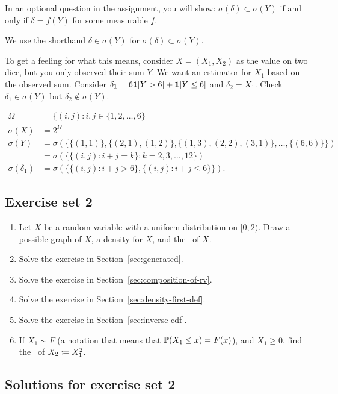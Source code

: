 \documentclass{article}
\begin{document}
 In an optional question in the assignment, you will show: $\sigma(\delta) \subset \sigma(Y)$ if and only if $\delta = f(Y)$ for some measurable $f$.

 We use the shorthand $\delta \in \sigma(Y)$ for $\sigma(\delta) \subset \sigma(Y)$.

 To get a feeling for what this means, consider $X = (X_1, X_2)$ as the value on two dice, but you only observed their sum $Y$. We want an estimator for $X_1$ based on the observed sum. Consider $\delta_1 = 6 \1[Y > 6] + \1[Y \le 6]$ and $\delta_2 = X_1$. Check $\delta_1 \in \sigma(Y)$ but $\delta_2 \notin \sigma(Y)$.

\begin{align*}
\Omega &= \{ (i, j) : i,j \in \{1, 2, \dots, 6\} \\
\sigma(X) &= 2^{\Omega} \\
\sigma(Y) &= \sigma(\{\{(1,1)\}, \{(2,1), (1,2)\}, \{(1,3),(2,2),(3,1)\}, \dots, \{(6,6)\}\}) \\
&= \sigma( \{ \{(i,j) : i + j = k\}   : k = 2, 3, \dots, 12  \} ) \\
\sigma(\delta_1) &= \sigma( \{ \{(i,j) : i + j > 6\}, \{(i,j) : i + j \le 6\}  \} ). 
\end{align*}


\subsection{Exercise set 2}\label{sec:ex-set-2}

\begin{enumerate}
  \item Let $X$ be a random variable with a uniform distribution on $[0, 2)$. Draw a possible graph of $X$, a density for $X$, and the \CDF\ of $X$.
  \item Solve the exercise in Section~\ref{sec:generated}.
  \item Solve the exercise in Section~\ref{sec:composition-of-rv}.
  \item Solve the exercise in Section~\ref{sec:density-first-def}.
  \item Solve the exercise in Section~\ref{sec:inverse-cdf}.
  \item If $X_1 \sim F$ (a notation that means that $\P(X_1 \le x) = F(x)$), and $X_1 \ge 0$, find the \CDF\ of $X_2 \defeq X_1^2$.
\end{enumerate}
 

\subsection{Solutions for exercise set 2}
\end{document}
